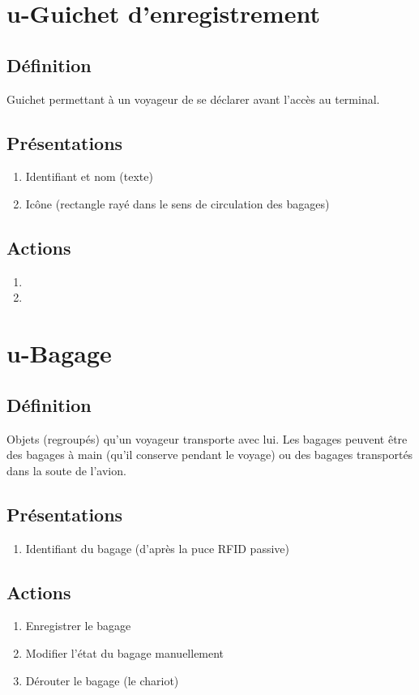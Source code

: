 \section{u-Guichet d'enregistrement}
\subsection{Définition}
	Guichet permettant à un voyageur de se déclarer avant l'accès au terminal.

\subsection{Présentations}
\begin{enumerate}
	\item Identifiant et nom (texte)
	\item Icône (rectangle rayé dans le sens de circulation des bagages)
\end{enumerate}

\subsection{Actions}
\begin{enumerate}
	\item {}
	\item {}
\end{enumerate}

\section{u-Bagage}
\subsection{Définition}
	Objets (regroupés) qu'un voyageur transporte avec lui. Les bagages peuvent être des bagages à main (qu'il conserve pendant
	le voyage) ou des bagages transportés dans la soute de l'avion.

\subsection{Présentations}
\begin{enumerate}
	\item Identifiant du bagage (d'après la puce RFID passive)
\end{enumerate}

\subsection{Actions}
\begin{enumerate}
	\item Enregistrer le bagage
	\item Modifier l'état du bagage manuellement
	\item Dérouter le bagage (le chariot)
\end{enumerate}

